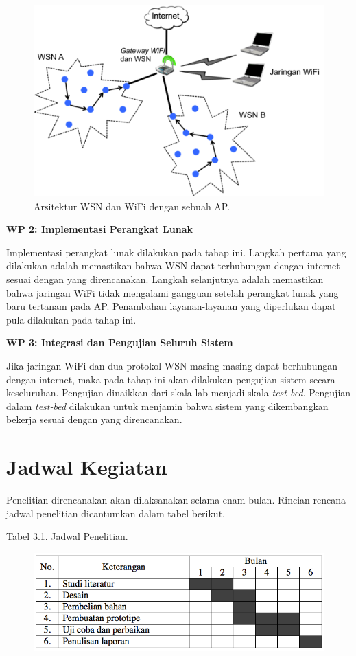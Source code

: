 \documentclass{jtetiproposalskripsi}
\begin{document}
\begin{figure}[ht!]
  \centering
    \includegraphics{gambar/wifi}
    \caption{Arsitektur WSN dan WiFi dengan sebuah AP.}
    \label{wifi}
\end{figure}

\textbf{WP 2: Implementasi Perangkat Lunak}

Implementasi perangkat lunak dilakukan pada tahap ini. Langkah pertama yang dilakukan adalah memastikan bahwa WSN dapat terhubungan dengan internet sesuai dengan yang direncanakan. Langkah selanjutnya adalah memastikan bahwa jaringan WiFi tidak mengalami gangguan setelah perangkat lunak yang baru tertanam pada AP. Penambahan layanan-layanan yang diperlukan dapat pula dilakukan pada tahap ini.

\textbf{WP 3: Integrasi dan Pengujian Seluruh Sistem}

Jika jaringan WiFi dan dua protokol WSN masing-masing dapat berhubungan dengan internet, maka pada tahap ini akan dilakukan pengujian sistem secara keseluruhan. Pengujian dinaikkan dari skala lab menjadi skala \emph{test-bed}. Pengujian dalam \emph{test-bed} dilakukan untuk menjamin bahwa sistem yang dikembangkan bekerja sesuai dengan yang direncanakan.

\section{Jadwal Kegiatan}
Penelitian direncanakan akan dilaksanakan selama enam bulan. Rincian rencana jadwal penelitian dicantumkan dalam tabel berikut.

\begin{center}
Tabel 3.1. Jadwal Penelitian.
\end{center}
\vspace{-0.5cm}
\begin{figure}[ht!]
  \centering
    \includegraphics[width=13cm]{gambar/timeline}
\end{figure}
\end{document}
